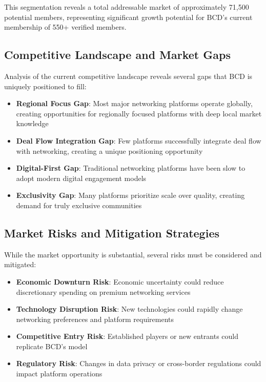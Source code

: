 This segmentation reveals a total addressable market of approximately 71,500 potential members, representing significant growth potential for BCD's current membership of 550+ verified members.

\subsection{Competitive Landscape and Market Gaps}

Analysis of the current competitive landscape reveals several gaps that BCD is uniquely positioned to fill:

\begin{itemize}
    \item \textbf{Regional Focus Gap}: Most major networking platforms operate globally, creating opportunities for regionally focused platforms with deep local market knowledge
    \item \textbf{Deal Flow Integration Gap}: Few platforms successfully integrate deal flow with networking, creating a unique positioning opportunity
    \item \textbf{Digital-First Gap}: Traditional networking platforms have been slow to adopt modern digital engagement models
    \item \textbf{Exclusivity Gap}: Many platforms prioritize scale over quality, creating demand for truly exclusive communities
\end{itemize}

\subsection{Market Risks and Mitigation Strategies}

While the market opportunity is substantial, several risks must be considered and mitigated:

\begin{itemize}
    \item \textbf{Economic Downturn Risk}: Economic uncertainty could reduce discretionary spending on premium networking services
    \item \textbf{Technology Disruption Risk}: New technologies could rapidly change networking preferences and platform requirements
    \item \textbf{Competitive Entry Risk}: Established players or new entrants could replicate BCD's model
    \item \textbf{Regulatory Risk}: Changes in data privacy or cross-border regulations could impact platform operations
\end{itemize}

